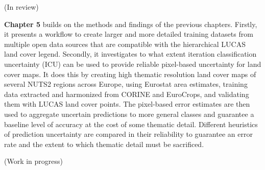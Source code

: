  (In review)

\textbf{Chapter 5} builds on the methods and findings of the previous chapters. 
Firstly, it presents a workflow to create larger and more detailed training datasets from multiple open data sources that are compatible with the hierarchical LUCAS land cover legend. 
Secondly, it investigates to what extent iteration classification uncertainty (ICU) can be used to provide reliable pixel-based uncertainty for land cover maps. It does this by creating high thematic resolution land cover maps of several NUTS2 regions across Europe, using Eurostat area estimates, training data extracted and harmonized from CORINE and EuroCrops, and validating them with LUCAS land cover points. 
The pixel-based error estimates are then used to aggregate uncertain predictions to more general classes and guarantee a baseline level of accuracy at the cost of some thematic detail. Different heuristics of prediction uncertainty are compared in their reliability to guarantee an error rate and the extent to which thematic detail must be sacrificed.

(Work in progress)